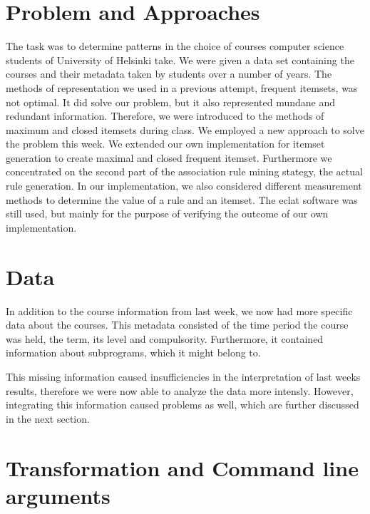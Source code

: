 



\section{Problem and Approaches}
The task was to determine patterns in the choice of courses computer science students of 
University of Helsinki take. We were given a data set containing the courses and their 
metadata taken by students over a number of years. The methods of representation we used in a previous 
attempt, frequent itemsets, was not optimal. It did solve our problem, but it also represented 
mundane and redundant information. Therefore, we were introduced to the methods
of maximum and closed itemsets during class.
\newline
We employed a new approach to solve the problem this week. We extended our own 
implementation for itemset generation to create maximal and closed frequent itemset. Furthermore we 
concentrated on the second part of the association rule 
mining stategy, the actual rule generation. In our implementation, we also considered different 
measurement methods to determine the value of a rule and an itemset.
\newline
The eclat software was still used, but mainly for the purpose of verifying the outcome of our own 
implementation.

\section{Data}

In addition to the course information from last week, we now had more
specific data about the courses. This metadata consisted of the time period the course was held,
the term, its level and compulsority. Furthermore, it contained information about subprograms,
which it might belong to.

This missing information caused insufficiencies in the interpretation of last weeks results, 
therefore we were now able to analyze the data more intensly.
However, integrating this information caused problems as well, which are further discussed in 
the next section.

\section{Transformation and Command line arguments}


